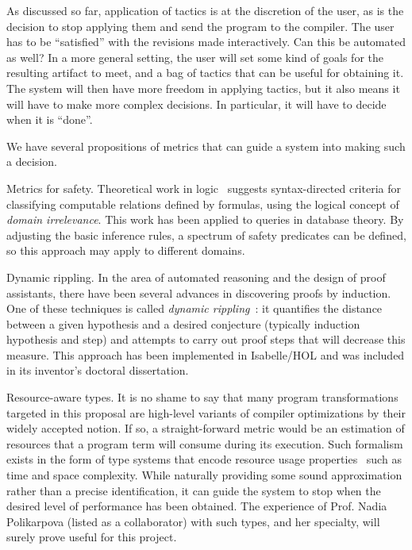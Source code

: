 As discussed so far, application of tactics is at the discretion of the
user, as is the decision to stop applying them and send the program to
the compiler.
The user has to be ``satisfied'' with the revisions made interactively.
Can this be automated as well?
In a more general setting, the user will set some kind of goals for the
resulting artifact to meet, and a bag of tactics that can be useful for
obtaining it.
The system will then have more freedom in applying tactics, but it also
means it will have to make more complex decisions.
In particular, it will have to decide when it is ``done''.

We have several propositions of metrics that can guide a system into
making such a decision.

\begin{paragraph}{Metrics for safety.} 
Theoretical work in logic~\cite{MLCS1994/Avron} suggests syntax-directed
criteria for classifying computable relations defined by formulas,
using the logical concept of \emph{domain irrelevance}.
This work has been applied to queries in database theory.
By adjusting the basic inference rules, a spectrum of safety predicates can
be defined, so this approach may apply to different domains.
\end{paragraph}

\begin{paragraph}{Dynamic rippling.}
In the area of automated reasoning and the design of proof assistants,
there have been several advances in discovering proofs by induction.
One of these techniques is called \emph{dynamic rippling}~\cite{Festschrift2017/JohanssonDB10}:
it quantifies the distance between a given hypothesis and a desired conjecture
(typically induction hypothesis and step) and attempts to carry out proof
steps that will decrease this measure.
This approach has been implemented in Isabelle/HOL and was included in
its inventor's doctoral dissertation.
\end{paragraph}

\begin{paragraph}{Resource-aware types.}
It is no shame to say that many program transformations targeted in this
proposal are high-level variants of compiler optimizations by their widely
accepted notion.
If so, a straight-forward metric would be an estimation of resources
that a program term will consume during its execution.
Such formalism exists in the form of type systems that encode resource
usage properties~\cite{CAV2012/Hoffman} such as time and space complexity.
While naturally providing some sound approximation rather than a precise
identification, it can guide the system to stop when the desired level
of performance has been obtained.
The experience of Prof. Nadia Polikarpova (listed as a collaborator) with such types, 
and her specialty, will surely prove useful for this project.
\end{paragraph}

